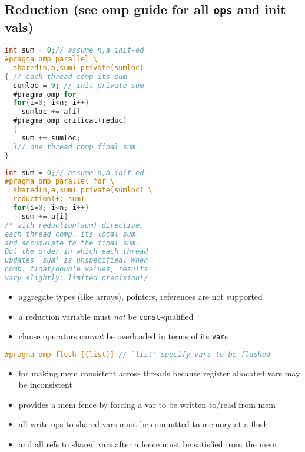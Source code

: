 \documentclass[8pt,a4paper,landscape]{extarticle}
\begin{document}
\begin{multicols*}{3}
\subsection*{Reduction (see omp guide for all \texttt{ops} and init vals)}
\begin{minipage}{0.5\linewidth}
\begin{lstlisting}[language=C,xleftmargin=1pt,xrightmargin=3pt]
int sum = 0;// assume n,a init-ed
#pragma omp parallel \
  shared(n,a,sum) private(sumloc)
{ // each thread comp its sum
  sumloc = 0; // init private sum
  #pragma omp for
  for(i=0; i<n; i++)
    sumloc += a[i]
  #pragma omp critical(reduc)
  {
    sum += sumloc;
  }// one thread comp final sum
}
\end{lstlisting}
\end{minipage}
\begin{minipage}{0.5\linewidth}
\begin{lstlisting}[language=C,xleftmargin=3pt]
int sum = 0;// assume n,a init-ed
#pragma omp parallel for \
  shared(n,a,sum) private(sumloc) \
  reduction(+: sum)
  for(i=0; i<n; i++)
    sum += a[i]
/* with reduction(sum) directive,
each thread comp. its local sum
and accumulate to the final sum.
But the order in which each thread
updates `sum' is unspecified. When
comp. float/double values, results
vary slightly: limited precision*/
\end{lstlisting}
\end{minipage}
\begin{itemize}
\item aggregate types (like arrays), pointers, references are not supported
\item a reduction variable must \emph{not} be \texttt{const}-qualified
\item clause operators can\emph{not} be overloaded in terms of its \texttt{var}s
\end{itemize}
\begin{lstlisting}[language=C]
#pragma omp flush [(list)] // `list' specify vars to be flushed
\end{lstlisting}
\begin{itemize}
\item for making mem consistent across threads because register allocated vars may be inconsistent
\item provides a mem fence by forcing a var to be written to/read from mem
\item all write ops to shared vars must be committed to memory at a flush
\item and all refs to shared vars after a fence must be satisfied from the mem

\end{itemize}
\end{multicols*}
\end{document}
